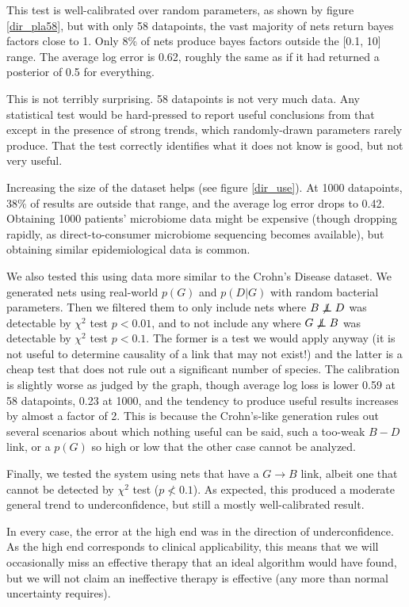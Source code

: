 \documentclass[letterpaper]{article}
\newcommand\indep{\protect\mathpalette{\protect\independenT}{\perp}}
\def\independenT#1#2{\mathrel{\rlap{$#1#2$}\mkern2mu{#1#2}}}
\begin{document}
This test is well-calibrated over random parameters, as shown by
figure \ref{dir_pla58}, but with only 58 datapoints, the vast majority
of nets return bayes factors close to 1.  Only 8\% of nets produce
bayes factors outside the [0.1, 10] range.  The average log error is
0.62, roughly the same as if it had returned a posterior of 0.5 for
everything.

This is not terribly surprising.  58 datapoints is not very much
data.  Any statistical test would be hard-pressed to report useful
conclusions from that except in the presence of strong trends, which
randomly-drawn parameters rarely produce.  That the test correctly
identifies what it does not know is good, but not very useful.

Increasing the size of the dataset helps (see figure \ref{dir_use}).
At 1000 datapoints, 38\% of results are outside that range, and the
average log error drops to 0.42. Obtaining 1000 patients'
microbiome data might be expensive (though dropping rapidly, as
direct-to-consumer microbiome sequencing becomes available), but
obtaining similar epidemiological data is common.

We also tested this using data more similar to the Crohn's Disease
dataset.  We generated nets using real-world $p(G)$ and $p(D|G)$ with
random bacterial parameters.  Then we filtered them to only include
nets where $B \not\indep D$ was detectable by $\chi^2$ test $p<0.01$,
and to not include any where $G \not\indep B$ was detectable by
$\chi^2$ test $p<0.1$.  The 
former is a test we would apply anyway (it is not useful to determine
causality of a link that may not exist!) and the latter is a cheap
test that does not rule out a significant number of species.  The
calibration is slightly worse as judged by the graph, though average
log loss is lower 0.59 at 58 datapoints, 0.23 at 1000, and the
tendency to produce useful results increases by almost a factor of 2.
This is because the Crohn's-like generation rules out several
scenarios about which nothing useful can be said, such a too-weak
$B-D$ link, or a $p(G)$ so high or low that the other case cannot be
analyzed.

Finally, we tested the system using nets that have a $G\rightarrow B$
link, albeit one that cannot be detected by $\chi^2$ test
($p\not<0.1$).  As expected, this produced a moderate general trend to
underconfidence, but still a mostly well-calibrated result.

In every case, the error at the high end was in the direction of
underconfidence.  As the high end corresponds to clinical
applicability, this means that we will occasionally miss an effective
therapy that an ideal algorithm would have found, but we will not
claim an ineffective therapy is effective (any more than normal
uncertainty requires).
\end{document}
